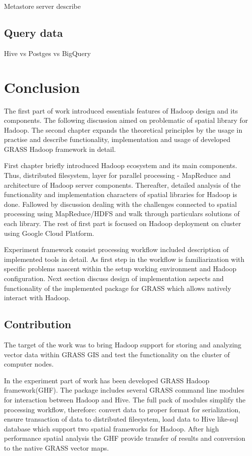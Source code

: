 \documentclass[a4paper,12pt,oneside]{report}
\begin{document}
	
	Metastore server describe
	
	
	
	\subsection{Query data}
	Hive vs Postges vs BigQuery
	
	
	
	
	
	
	\section{Conclusion}
	
	The first part of work introduced essentials features of Hadoop design and its
	components. The following discussion aimed on problematic of spatial library
	for Hadoop. The second chapter expands the theoretical principles by the usage
	in practise and describe functionality, implementation and usage of  developed
	GRASS Hadoop framework in detail.
	
	First chapter briefly introduced Hadoop ecosystem and its main components. Thus,
	distributed filesystem, layer for parallel processing - MapReduce and
	architecture of Hadoop server components. Thereafter, detailed analysis of the
	functionality and implementation characters of spatial libraries for Hadoop is
	done. Fallowed by discussion dealing with the challenges connected to spatial
	processing using MapReduce/HDFS and walk through particulars solutions of each
	library. The rest of first part is focused on Hadoop deployment on cluster using Google
	Cloud Platform.
	
	Experiment framework consist processing workflow included description of
	implemented tools in detail. As first step in the workflow is familiarization
	with specific problems nascent within the setup working environment and Hadoop
	configuration. Next section discuss design of implementation  aspects and
	functionality of the implemented package for GRASS which allows natively
	interact with Hadoop.  
	
	
	\subsection*{Contribution}
	The target of the work was to bring Hadoop support for storing and analyzing
	vector data within GRASS GIS and test the functionality on the cluster of
	computer nodes. 
	
	In the experiment part of work has been developed GRASS Hadoop framework(GHF).
	The package includes several GRASS command line modules for interaction between Hadoop and Hive. The full pack of
	modules simplify the processing workflow, therefore: convert data to proper format
	for serialization, ensure transaction of data to distributed filesystem, load
	data to Hive like-sql database which support two spatial frameworks for Hadoop.
	After high performance spatial analysis the GHF provide transfer of results and
	conversion to the native GRASS vector maps. 
	
\end{document}
